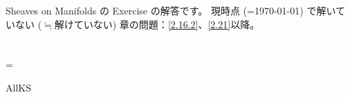 \documentclass[uplatex,dvipdfmx]{jsarticle}
\begin{document}
\maketitle

Sheaves on Manifolds \cite[Chapter ]{kashiwara2002sheaves}の
Exercise の解答です。
現時点 (=\today) で解いていない (\(\fallingdotseq\)解けていない)
章の問題：\autoref{2.16.2}、\autoref{2.21}以降。
\HeaderKS
\fi

\newpage
\section{}

\LocParaCptRemark

\KSLoopChapCount=\value{section}


\ifcsname AllKS\endcsname\else
\printbibliography
\end{document}
